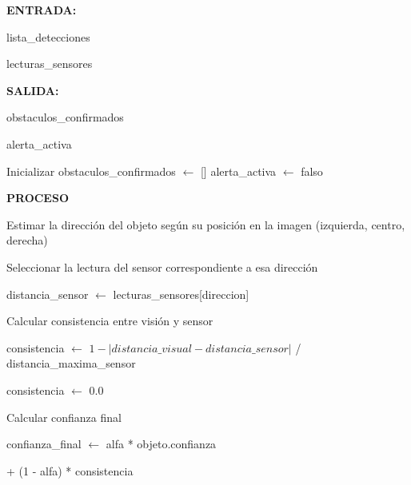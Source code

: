 \begin{algorithmic}[1]

\Statex \textbf{ENTRADA:}

\Statex lista\_detecciones

\Statex lecturas\_sensores

\Statex
\Statex \textbf{SALIDA:}

\Statex obstaculos\_confirmados

\Statex alerta\_activa

\Statex
\State Inicializar obstaculos\_confirmados $\gets$ []
\State alerta\_activa $\gets$ falso

\Statex
\Statex \textbf{PROCESO}

    \State Estimar la dirección del objeto según su posición
    \State en la imagen (izquierda, centro, derecha)

    \Statex

    \State Seleccionar la lectura del sensor correspondiente
    \State a esa dirección

    \State distancia\_sensor $\gets$
    lecturas\_sensores[direccion]

    \Statex

    \State Calcular consistencia entre visión y sensor


        \State consistencia $\gets$
        $1 - |distancia\_visual - distancia\_sensor|$
        \Statex \hspace{2.2cm} / distancia\_maxima\_sensor

    \Else

        \State consistencia $\gets$ 0.0

    \EndIf

    \Statex

    \State Calcular confianza final

    \State confianza\_final $\gets$
    alfa * objeto.confianza

    \Statex \hspace{1.3cm} + (1 - alfa) * consistencia

    \Statex



\end{algorithmic}
